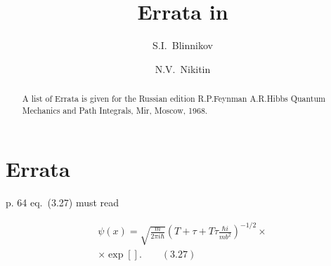 \documentclass[%
onecolumn,%
oneside,%
floats,%
aps,%
 prd,%
nobibnotes,%
nofootinbib,%
amsmath,%
amssymb,%
amsfonts,%
amscd,%
  superscriptaddress,%
eqsecnum%
]{revtex4}
\begin{document}
\title{Errata in }

\author{S.I.~Blinnikov}

\author{N.V.~Nikitin}


\begin{abstract}
A list of Errata is given for the Russian edition R.P.Feynman A.R.Hibbs Quantum Mechanics and Path Integrals, Mir, Moscow, 1968.

\end{abstract}

\maketitle

\section{Errata}
\label{sec:errata}

p. 64 eq.~(3.27) must read

\begin{eqnarray*}
 \psi(x) =   \sqrt{\frac{m}{2\pi i \hbar}} \left(T + \tau + T \tau \frac{\hbar i}{m b^2}\right)^{-1/2} \times \\
 \times \exp\left[ \right] .
 \qquad (3.27)
\end{eqnarray*}
\end{document}
